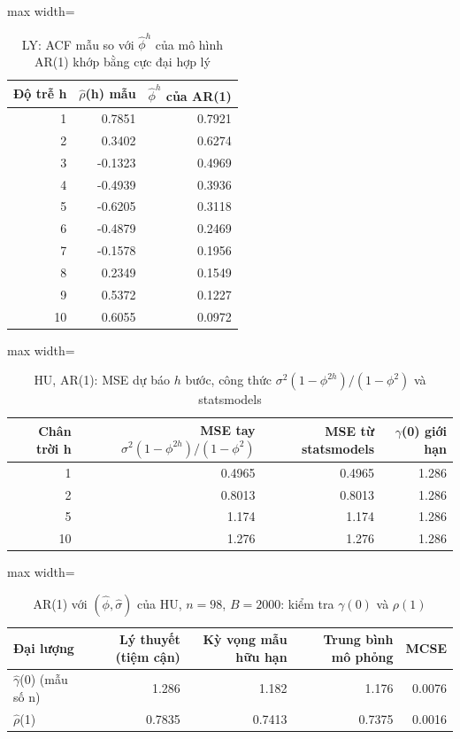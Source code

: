 \begin{table}[H]
\centering\footnotesize
\caption{LY: ACF mẫu so với $\hat\phi^h$ của mô hình AR(1) khớp bằng cực đại hợp lý}\label{tab:tab_b11_06_ly_ar1}
\begin{adjustbox}{max width=\linewidth}
\begin{tabular}{|r|r|r|}
\toprule
Độ trễ h & $\hat{\rho}$(h) mẫu & $\hat{\phi}^{h}$ của AR(1) \\
\midrule
1 & 0.7851 & 0.7921 \\
2 & 0.3402 & 0.6274 \\
3 & -0.1323 & 0.4969 \\
4 & -0.4939 & 0.3936 \\
5 & -0.6205 & 0.3118 \\
6 & -0.4879 & 0.2469 \\
7 & -0.1578 & 0.1956 \\
8 & 0.2349 & 0.1549 \\
9 & 0.5372 & 0.1227 \\
10 & 0.6055 & 0.0972 \\
\bottomrule
\end{tabular}
\end{adjustbox}
\end{table}
\begin{table}[H]
\centering\footnotesize
\caption{HU, AR(1): MSE dự báo $h$ bước, công thức $\sigma^2(1-\phi^{2h})/(1-\phi^2)$ và statsmodels}\label{tab:tab_b11_06_ar1_forecast_mse}
\begin{adjustbox}{max width=\linewidth}
\begin{tabular}{|r|r|r|r|}
\toprule
Chân trời h & MSE tay $\sigma^2(1-\phi^{2h})/(1-\phi^2)$ & MSE từ statsmodels & $\gamma$(0) giới hạn \\
\midrule
1 & 0.4965 & 0.4965 & 1.286 \\
2 & 0.8013 & 0.8013 & 1.286 \\
5 & 1.174 & 1.174 & 1.286 \\
10 & 1.276 & 1.276 & 1.286 \\
\bottomrule
\end{tabular}
\end{adjustbox}
\end{table}
\begin{table}[H]
\centering\footnotesize
\caption{AR(1) với $(\hat\phi,\hat\sigma)$ của HU, $n=98$, $B=2000$: kiểm tra $\gamma(0)$ và $\rho(1)$}\label{tab:tab_b11_06_ar1_simulation}
\begin{adjustbox}{max width=\linewidth}
\begin{tabular}{|l|r|r|r|r|}
\toprule
Đại lượng & Lý thuyết (tiệm cận) & Kỳ vọng mẫu hữu hạn & Trung bình mô phỏng & MCSE \\
\midrule
$\hat{\gamma}$(0) (mẫu số n) & 1.286 & 1.182 & 1.176 & 0.0076 \\
$\hat{\rho}$(1) & 0.7835 & 0.7413 & 0.7375 & 0.0016 \\
\bottomrule
\end{tabular}
\end{adjustbox}\par{}
\end{table}
